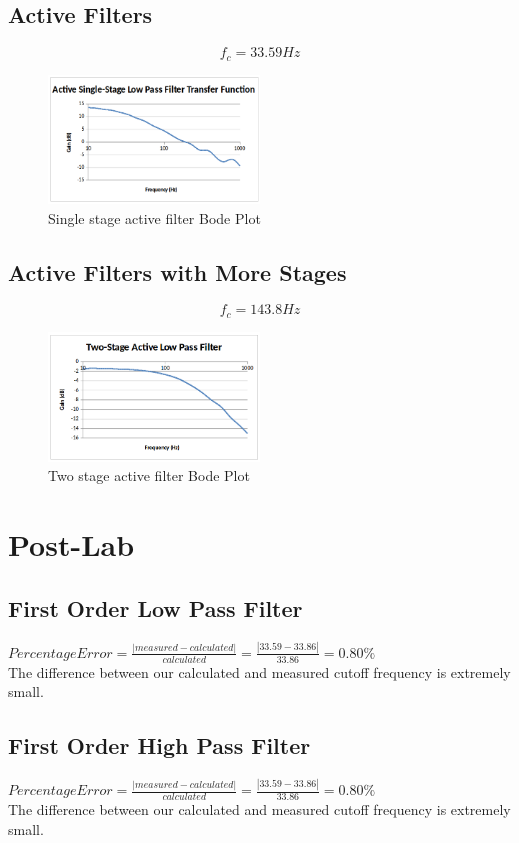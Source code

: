 \documentclass[10pt]{article}
\begin{document}
\subsection*{Active Filters}
$$f_c = 33.59Hz$$
\begin{figure}[H]
	\centering
	\includegraphics[width=0.5\textwidth]{SingleStage.png}
	\caption{Single stage active filter Bode Plot}
\end{figure}

\subsection*{Active Filters with More Stages}
$$f_c = 143.8Hz$$
\begin{figure}[H]
	\centering
	\includegraphics[width=0.5\textwidth]{TwoStage.png}
	\caption{Two stage active filter Bode Plot}
\end{figure}

\section*{Post-Lab}
\subsection*{First Order Low Pass Filter}
$Percentage Error = \frac{|measured-calculated|}{calculated} = \frac{|33.59-33.86|}{33.86} = 0.80\%$\\
\noindent The difference between our calculated and measured cutoff frequency is extremely small.

\subsection*{First Order High Pass Filter}
$Percentage Error = \frac{|measured-calculated|}{calculated} = \frac{|33.59-33.86|}{33.86} = 0.80\%$\\
\noindent The difference between our calculated and measured cutoff frequency is extremely small.
\end{document}
